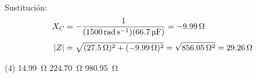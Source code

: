 \documentclass[12pt, letter]{exam}
\begin{document}
\begin{questions}
    Sustitución:
    \begin{align*}
    X_{C} &= - \dfrac{1}{(\SI{1500}{\radian\per\second})(\SI{66.7}{\micro\farad})} = -\SI{9.99}{\ohm} \\[0.3em]
    \abs{Z} &= \sqrt{(\SI{27.5}{\ohm})^{2} + (\SI{-9.99}{\ohm})^{2}} = \sqrt{\SI{856.05}{\square\ohm}} = \SI{29.26}{\ohm}
    \end{align*}

    \vspace{0.3cm}
    \begin{tasks}(4)
        \task \SI{14.99}{\ohm}
        \task {}
        \task \SI{224.70}{\ohm}
        \task \SI{980.95}{\ohm}
    \end{tasks}

    
      
    

\end{questions}
\end{document}
